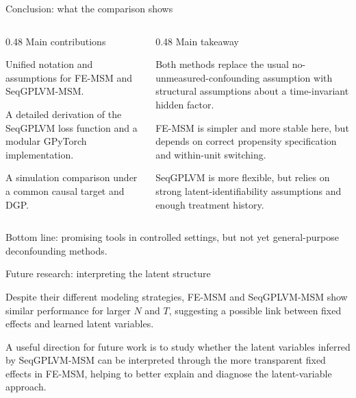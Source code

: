 \documentclass[aspectratio=169,12pt]{beamer}
\newcommand{\red}[1]{\textcolor{PrimerRed}{#1}}
\newcommand{\teal}[1]{\textcolor{PrimerTeal}{#1}}
\newcommand{\spacedparagraph}[1]{\par\noindent\begin{minipage}{0.96\linewidth}\RaggedRight #1\end{minipage}\par\vspace{0.55em}}
\begin{document}
\begin{frame}{Conclusion: what the comparison shows}
\begin{columns}[T,onlytextwidth]
\begin{column}{0.48\textwidth}
{\fontsize{11}{14}\selectfont\teal{Main contributions}}\par
\vspace{0.25cm}
\spacedparagraph{Unified notation and assumptions for FE-MSM and SeqGPLVM-MSM.}
\spacedparagraph{A detailed derivation of the SeqGPLVM loss function and a modular GPyTorch implementation.}
\spacedparagraph{A simulation comparison under a common causal target and DGP.}
\end{column}
\begin{column}{0.48\textwidth}
{\fontsize{11}{14}\selectfont\teal{Main takeaway}}\par
\vspace{0.25cm}
\spacedparagraph{Both methods replace the usual no-unmeasured-confounding assumption with structural assumptions about a time-invariant hidden factor.}
\spacedparagraph{FE-MSM is simpler and more stable here, but depends on correct propensity specification and within-unit switching.}
\spacedparagraph{SeqGPLVM is more flexible, but relies on strong latent-identifiability assumptions and enough treatment history.}
\end{column}
\end{columns}
\vspace{0.25cm}
{\fontsize{10.3}{14}\selectfont\RaggedRight\red{Bottom line:} promising tools in controlled settings, but not yet general-purpose deconfounding methods.\par}
\end{frame}

\begin{frame}{Future research: interpreting the latent structure}

\vspace{0.15cm}

{\fontsize{11}{15}\selectfont
\spacedparagraph{
Despite their different modeling strategies, FE-MSM and SeqGPLVM-MSM show similar performance for larger \(N\) and \(T\), suggesting a possible link between fixed effects and learned latent variables.
}
\vspace{0.20cm}
\spacedparagraph{
A useful direction for future work is to study whether the latent variables inferred by SeqGPLVM-MSM can be interpreted through the more transparent fixed effects in FE-MSM, helping to better explain and diagnose the latent-variable approach.
}
}

\end{frame}
\end{document}
